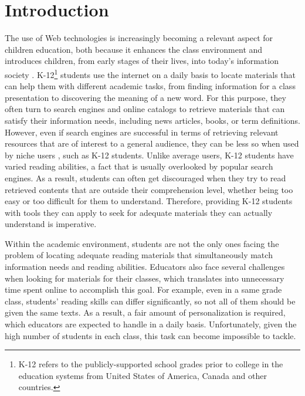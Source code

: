 \documentclass{sig-alternate-05-2015}
\begin{document}
\section{Introduction}
\noindent
The use of Web technologies is increasingly becoming a relevant aspect for children education, both because it enhances the class environment and introduces children, from early stages of their lives, into today's information society \cite{sadaf2012exploring}. K-12\footnote{K-12 refers to the publicly-supported school grades prior to college in the education systems from United States of America, Canada and other countries.} students use the internet on a daily basis to locate materials that can help them with different academic tasks, from finding information for a class presentation to discovering the meaning of a new word. For this purpose, they often turn to search engines and online catalogs to retrieve materials that can satisfy their information needs, including news articles, books, or term definitions. However, even if search engines are successful in terms of retrieving relevant resources that are of interest to a general audience, they can be less so when used by niche users \cite{wang2013personalized}, such as K-12 students. Unlike average users, K-12 students have varied  reading abilities, a fact that is usually overlooked by popular search engines. As a result, students can often get discouraged when they try to read retrieved contents that are outside their comprehension level, whether being too easy or too difficult  for them to understand. Therefore, providing K-12 students with tools they can apply to seek for adequate materials they can actually understand is imperative.



Within the academic environment, students are not the only ones facing the problem of locating adequate reading materials that simultaneously match information needs and reading abilities. Educators also face several challenges when looking for materials for their classes, which translates into unnecessary time spent online to accomplish this goal. For example, even in a same grade class, students' reading skills can differ significantly, so not all of them should be given the same texts. As a result, a fair amount of personalization is required, which educators are expected to handle in a daily basis. Unfortunately, given the high number of students in each class, this task can become impossible to tackle. 
\end{document}
